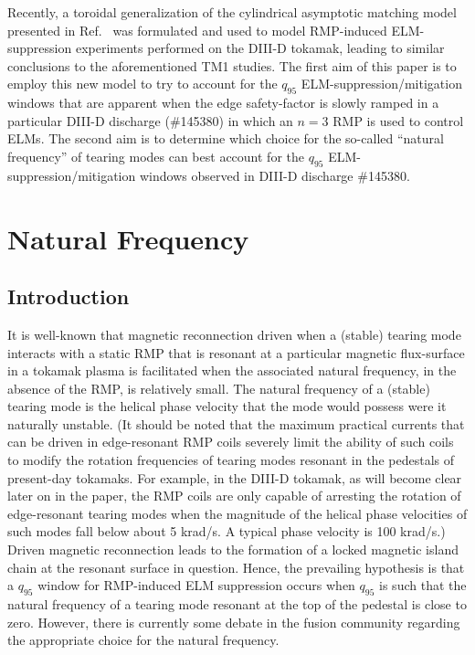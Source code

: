 \documentclass[12pt,prb,aps]{revtex4-1}
\begin{document}
Recently, a toroidal generalization of the 
cylindrical asymptotic matching model presented
in Ref.~ was formulated and
used to model  RMP-induced ELM-suppression experiments performed on the DIII-D tokamak,\cite{rf2}
leading to similar conclusions to the aforementioned TM1
studies. The first aim of this paper is to employ this
new model to try to account for the  $q_{95}$
ELM-suppression/mitigation windows  that are apparent when the edge safety-factor is slowly ramped in
a particular DIII-D discharge (\#145380) in which an $n=3$
RMP is used to control ELMs.\cite{d3d,d3d2} The second aim is to determine  which choice for the so-called ``natural frequency''  of tearing modes can best account for the   $q_{95}$ 
ELM-suppression/mitigation windows  observed in DIII-D discharge \#145380. 

\section{Natural Frequency}
\subsection{Introduction}
It is well-known that magnetic reconnection driven when a  (stable) tearing mode interacts with a static RMP that is resonant at a particular magnetic flux-surface in a tokamak plasma is
facilitated when the associated natural frequency, in the absence of the RMP,  is relatively small.\cite{rfa,rfb}  The natural frequency  of a  (stable) tearing mode is the
helical phase velocity that the mode would possess were it naturally unstable.  (It should be noted that the maximum practical currents
that can be driven in edge-resonant RMP coils severely limit the ability of such coils to modify the rotation
frequencies of tearing modes resonant in the pedestals of present-day tokamaks.  For example, in the DIII-D tokamak, as will become clear later on in the paper,
the RMP coils are only capable of arresting the rotation of edge-resonant tearing modes when the magnitude of the helical
phase velocities of such modes fall below about 5 krad/s. A typical phase velocity is 100 krad/s.) Driven magnetic reconnection leads to the
formation of a locked magnetic island chain at the resonant surface in question. 
Hence, the prevailing hypothesis is that a $q_{95}$ window for
RMP-induced ELM suppression occurs when $q_{95}$ is such that the natural frequency of a tearing mode resonant  at 
the top of the pedestal is close to zero.\cite{d3d} 
However, there is currently some debate in the fusion community regarding the appropriate choice for the natural frequency. 
\end{document}
